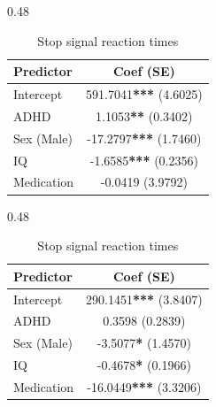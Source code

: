 \begin{table}[H]
\centering
\scriptsize
\begin{minipage}{\linewidth}
    \begin{subtable}[t]{0.48\linewidth}
    \centering
    \caption{Go success reaction times}
    \begin{tabular}{lc}
    \toprule
    \textbf{Predictor} & \textbf{Coef (SE)} \\
    \midrule
    Intercept & 591.7041\textbf{***} (4.6025) \\
    ADHD & 1.1053\textbf{**} (0.3402) \\
    Sex (Male) & -17.2797\textbf{***} (1.7460) \\
    IQ & -1.6585\textbf{***} (0.2356) \\
    Medication & -0.0419 (3.9792) \\
    \bottomrule
    \end{tabular}
    \end{subtable}
\hfill
    \begin{subtable}[t]{0.48\linewidth}
    \centering
    \caption{Stop signal reaction times}
    \begin{tabular}{lc}
    \toprule
    \textbf{Predictor} & \textbf{Coef (SE)} \\
    \midrule
    Intercept & 290.1451\textbf{***} (3.8407) \\
    ADHD & 0.3598 (0.2839) \\
    Sex (Male) & -3.5077\textbf{*} (1.4570) \\
    IQ & -0.4678\textbf{*} (0.1966) \\
    Medication & -16.0449\textbf{***} (3.3206) \\
    \bottomrule
    \end{tabular}
    \end{subtable}

\vspace{0.3cm}


\end{minipage}
\end{table}
